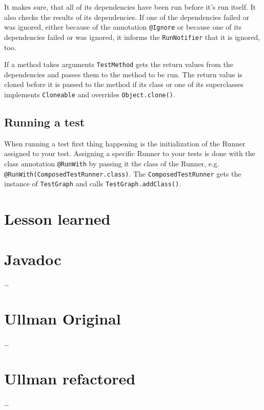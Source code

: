 \documentclass[11pt]{article}
\begin{document}
It makes sure, that all of its dependencies have been run before it's run itself. It also checks the results of its dependencies. If one of the dependencies failed or was ignored, either because of the annotation \verb|@Ignore| or because one of its dependencies failed or was ignored, it informs the \verb|RunNotifier| that it is ignored, too.

If a method takes arguments \verb|TestMethod| gets the return values from the dependencies and passes them to the method to be run. The return value is cloned before it is passed to the method if its class or one of its superclasses implements \verb|Cloneable| and overrides \verb|Object.clone()|.

\subsection{Running a test}

When running a test first thing happening is the initialization of the Runner assigned to your test. Assigning a specific Runner to your tests is done with the class annotation \verb|@RunWith| by passing it the class of the Runner, e.g. \verb|@RunWith(ComposedTestRunner.class)|.
The \verb|ComposedTestRunner| gets the instance of \verb|TestGraph| and calls \verb|TestGraph.addClass()|.

\section{Lesson learned}

\begin{appendix}
\section{Javadoc}
\dots

\section{Ullman Original}
\dots

\section{Ullman refactored}
\dots

\end{appendix}
\end{document}
